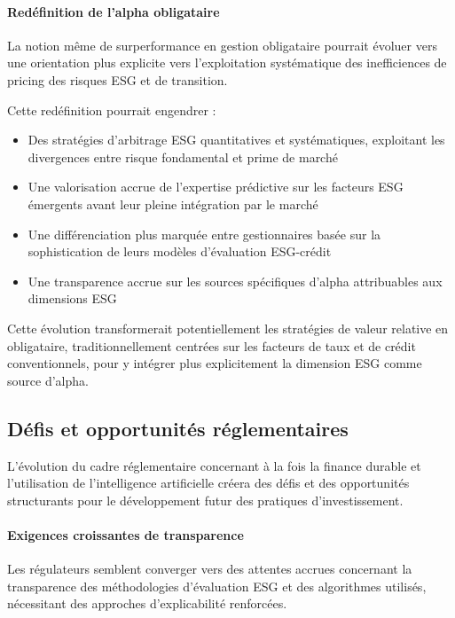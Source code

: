\paragraph{Redéfinition de l'alpha obligataire} 
La notion même de surperformance en gestion obligataire pourrait évoluer vers une orientation plus explicite vers l'exploitation systématique des inefficiences de pricing des risques ESG et de transition.

Cette redéfinition pourrait engendrer :
\begin{itemize}
    \item Des stratégies d'arbitrage ESG quantitatives et systématiques, exploitant les divergences entre risque fondamental et prime de marché
    \item Une valorisation accrue de l'expertise prédictive sur les facteurs ESG émergents avant leur pleine intégration par le marché
    \item Une différenciation plus marquée entre gestionnaires basée sur la sophistication de leurs modèles d'évaluation ESG-crédit
    \item Une transparence accrue sur les sources spécifiques d'alpha attribuables aux dimensions ESG
\end{itemize}

Cette évolution transformerait potentiellement les stratégies de valeur relative en obligataire, traditionnellement centrées sur les facteurs de taux et de crédit conventionnels, pour y intégrer plus explicitement la dimension ESG comme source d'alpha.

\subsection*{Défis et opportunités réglementaires}

L'évolution du cadre réglementaire concernant à la fois la finance durable et l'utilisation de l'intelligence artificielle créera des défis et des opportunités structurants pour le développement futur des pratiques d'investissement.

\paragraph{Exigences croissantes de transparence} 
Les régulateurs semblent converger vers des attentes accrues concernant la transparence des méthodologies d'évaluation ESG et des algorithmes utilisés, nécessitant des approches d'explicabilité renforcées.

